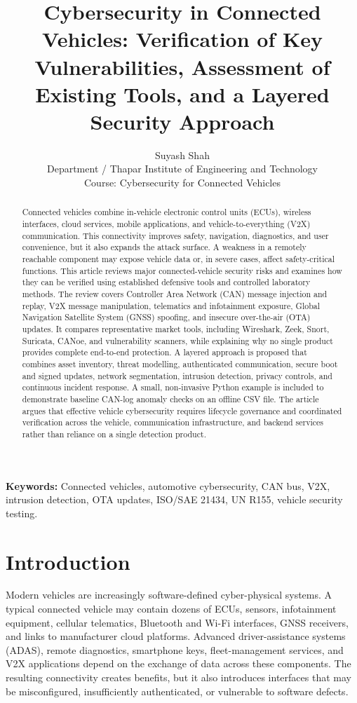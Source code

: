\documentclass[11pt]{article}
\title{Cybersecurity in Connected Vehicles: Verification of Key Vulnerabilities, Assessment of Existing Tools, and a Layered Security Approach}
\author{Suyash Shah\\
Department / Thapar Institute of Engineering and Technology\\
Course: Cybersecurity for Connected Vehicles}
\date{}
\begin{document}
\maketitle

\begin{abstract}
Connected vehicles combine in-vehicle electronic control units (ECUs), wireless interfaces, cloud services, mobile applications, and vehicle-to-everything (V2X) communication. This connectivity improves safety, navigation, diagnostics, and user convenience, but it also expands the attack surface. A weakness in a remotely reachable component may expose vehicle data or, in severe cases, affect safety-critical functions. This article reviews major connected-vehicle security risks and examines how they can be verified using established defensive tools and controlled laboratory methods. The review covers Controller Area Network (CAN) message injection and replay, V2X message manipulation, telematics and infotainment exposure, Global Navigation Satellite System (GNSS) spoofing, and insecure over-the-air (OTA) updates. It compares representative market tools, including Wireshark, Zeek, Snort, Suricata, CANoe, and vulnerability scanners, while explaining why no single product provides complete end-to-end protection. A layered approach is proposed that combines asset inventory, threat modelling, authenticated communication, secure boot and signed updates, network segmentation, intrusion detection, privacy controls, and continuous incident response. A small, non-invasive Python example is included to demonstrate baseline CAN-log anomaly checks on an offline CSV file. The article argues that effective vehicle cybersecurity requires lifecycle governance and coordinated verification across the vehicle, communication infrastructure, and backend services rather than reliance on a single detection product.
\end{abstract}

\noindent\textbf{Keywords:} Connected vehicles, automotive cybersecurity, CAN bus, V2X, intrusion detection, OTA updates, ISO/SAE 21434, UN R155, vehicle security testing.

\section{Introduction}
Modern vehicles are increasingly software-defined cyber-physical systems. A typical connected vehicle may contain dozens of ECUs, sensors, infotainment equipment, cellular telematics, Bluetooth and Wi-Fi interfaces, GNSS receivers, and links to manufacturer cloud platforms. Advanced driver-assistance systems (ADAS), remote diagnostics, smartphone keys, fleet-management services, and V2X applications depend on the exchange of data across these components. The resulting connectivity creates benefits, but it also introduces interfaces that may be misconfigured, insufficiently authenticated, or vulnerable to software defects.
\end{document}
